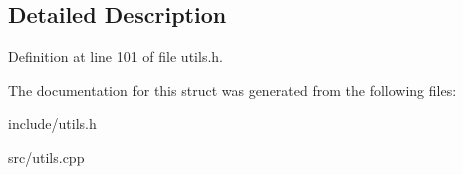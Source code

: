 \subsection{Detailed Description}


Definition at line 101 of file utils.\+h.



The documentation for this struct was generated from the following files\+:\begin{DoxyCompactItemize}
\item 
include/utils.\+h\item 
src/utils.\+cpp\end{DoxyCompactItemize}

